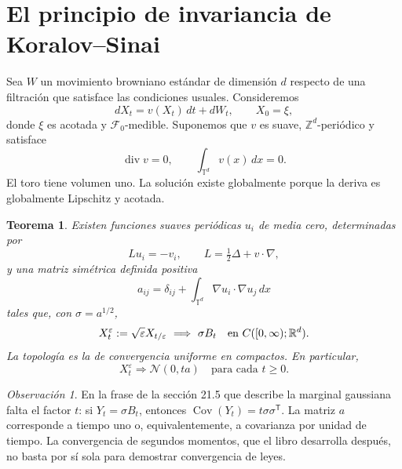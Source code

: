 \documentclass[11pt,a4paper]{article}
\newtheorem{theorem}{Teorema}
\theoremstyle{remark}\newtheorem{remark}{Observación}
\newcommand{\R}{\mathbb R}
\newcommand{\T}{\mathbb T}
\DeclareMathOperator{\diver}{div}
\DeclareMathOperator{\Cov}{Cov}
\begin{document}
\section{El principio de invariancia de Koralov--Sinai}
Sea $W$ un movimiento browniano estándar de dimensión $d$ respecto de una filtración que satisface las condiciones usuales. Consideremos
\begin{equation}\label{eq:sde}
 dX_t=v(X_t)\,dt+dW_t,\qquad X_0=\xi,
\end{equation}
donde $\xi$ es acotada y $\mathcal F_0$-medible. Suponemos que $v$ es suave, $\mathbb Z^d$-periódico y satisface
\begin{equation}\label{eq:assumptions}
 \diver v=0,\qquad \int_{\T^d}v(x)\,dx=0.
\end{equation}
El toro tiene volumen uno. La solución existe globalmente porque la deriva es globalmente Lipschitz y acotada.

\begin{theorem}\label{thm:main}
Existen funciones suaves periódicas $u_i$ de media cero, determinadas por
\begin{equation}\label{eq:cell}
 Lu_i=-v_i,\qquad L=\tfrac12\Delta+v\cdot\nabla,
\end{equation}
y una matriz simétrica definida positiva
\begin{equation}\label{eq:a}
 a_{ij}=\delta_{ij}+\int_{\T^d}\nabla u_i\cdot\nabla u_j\,dx
\end{equation}
tales que, con $\sigma=a^{1/2}$,
\[
 X_t^\varepsilon:=\sqrt\varepsilon X_{t/\varepsilon}
 \ \Longrightarrow\ \sigma B_t
 \quad\hbox{en }C([0,\infty);\R^d).
\]
La topología es la de convergencia uniforme en compactos. En particular,
\[
 X_t^\varepsilon\Longrightarrow\mathcal N(0,ta)
 \quad\text{para cada }t\geq0.
\]
\end{theorem}

\begin{remark}
En la frase de la sección 21.5 que describe la marginal gaussiana falta el factor $t$: si $Y_t=\sigma B_t$, entonces $\Cov(Y_t)=t\sigma\sigma^{\mathsf T}$. La matriz $a$ corresponde a tiempo uno o, equivalentemente, a covarianza por unidad de tiempo. La convergencia de segundos momentos, que el libro desarrolla después, no basta por sí sola para demostrar convergencia de leyes.
\end{remark}
\end{document}
